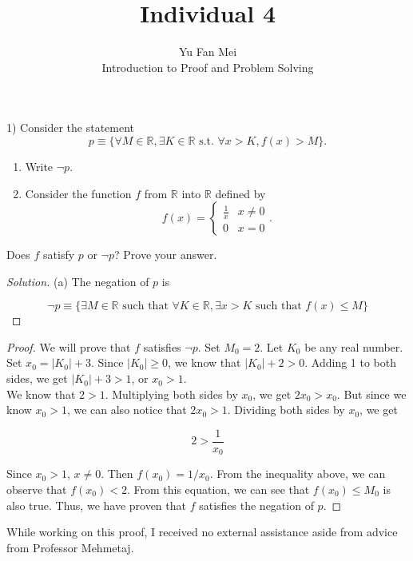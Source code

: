\documentclass[12pt]{article}
\newenvironment{problem}[2][Problem]{\begin{trivlist}
\item[\hskip \labelsep {\bfseries #1}\hskip \labelsep {\bfseries #2.}]}{\end{trivlist}}
\newenvironment{solution}
               {\let\oldqedsymbol=\qedsymbol
                \renewcommand{\qedsymbol}{$\blacktriangleleft$}
                \begin{proof}[\textit\upshape Solution]}
               {\end{proof}
                \renewcommand{\qedsymbol}{\oldqedsymbol}}
\begin{document}

\title{Individual 4}%
\author{Yu Fan Mei\\ %
	Introduction to Proof and Problem Solving} %

\maketitle

\begin{problem}{12} %
    (1) Consider the statement
    $$p \equiv \{\forall M \in \mathbb{R}, \exists K \in \mathbb{R}\,\, \text{s.t.} \,\,\forall x > K,
    f(x) > M\}.$$
    \begin{enumerate}
    \item[(a)] Write $\neg p$.
    \item[(b)] Consider the function $f$ from $\mathbb{R}$ into $\mathbb{R}$ defined by
    $$f(x) = \begin{cases}
    \frac{1}{x} & x \neq 0\\
    0 & x = 0
    \end{cases}.$$
    \end{enumerate}
    Does $f$ satisfy $p$ or $\neg p$? Prove your answer.
    

\end{problem}

\begin{solution}

    (a) The negation of $p$ is

    $$\lnot p \equiv \{ \exists M \in \mathbb{R} \text{ such that } \forall K \in \mathbb{R}, \exists x > K \text{ such that } f(x) \leq M\}$$
\end{solution}

\begin{proof}
    
    We will prove that $f$ satisfies $\lnot p.$ Set $M_0 = 2$. Let $K_0$ be any real number. Set $x_0 = |K_0| + 3$. Since $|K_0| \geq 0$, we know that $|K_0| + 2 > 0$. Adding 1 to both sides, we get $|K_0| + 3 > 1$, or $x_0 > 1$. \\
    
    \noindent We know that $2 > 1$. Multiplying both sides by $x_0$, we get $2x_0 > x_0.$ But since we know $x_0 > 1$, we can also notice that $2x_0 > 1$. Dividing both sides by $x_0$, we get 
    
    $$2 > \frac{1}{x_0}$$

    Since $x_0 > 1$, $x \neq 0$. Then $f(x_0) = 1/x_0$. From the inequality above, we can observe that $f(x_0) < 2$. From this equation, we can see that $f(x_0) \leq M_0$ is also true. Thus, we have proven that $f$ satisfies the negation of $p$.
\end{proof}


\noindent While working on this proof, I received no external assistance aside from advice from Professor Mehmetaj.
\end{document}
